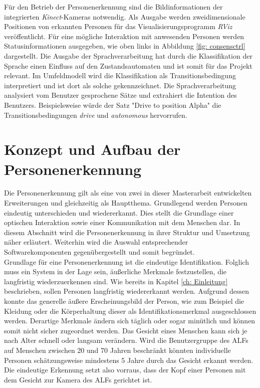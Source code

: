 	Für den Betrieb der Personenerkennung sind die Bildinformationen der integrierten \textit{Kinect}-Kameras notwendig. Als Ausgabe werden zweidimensionale Positionen von erkannten Personen für das Visualisierungsprogramm \textit{RViz} veröffentlicht. Für eine mögliche Interaktion mit anwesenden Personen werden Statusinformationen  ausgegeben, wie oben links in Abbildung \ref{fig: consensctrl} dargestellt. Die Ausgabe der Sprachverarbeitung hat durch die Klassifikation der Sprache einen Einfluss auf den Zustandsautomaten und ist somit für das Projekt relevant. Im Umfeldmodell wird die Klassifikation als Transitionsbedingung interpretiert und ist dort als solche gekennzeichnet. Die Sprachverarbeitung analysiert vom Benutzer gesprochene Sätze und extrahiert die Intention des Benutzers. Beispielsweise würde der Satz "Drive to position Alpha" die Transitionsbedingungen \textit{drive} und \textit{autonomous} hervorrufen. \\
		
	
	
	
	
	\section{Konzept und Aufbau der Personenerkennung}
	\label{sec: Konzept Personenerkennung}
	
	Die Personenerkennung gilt als eine von zwei in dieser Masterarbeit entwickelten Erweiterungen und gleichzeitig als Hauptthema. Grundlegend werden Personen eindeutig unterschieden und wiedererkannt. Dies stellt die Grundlage einer optischen Interaktion sowie einer Kommunikation mit dem Menschen dar. In diesem Abschnitt wird die Personenerkennung in ihrer Struktur und Umsetzung näher erläutert. Weiterhin wird die Auswahl entsprechender Softwarekomponenten gegenübergestellt und somit begründet.\\
	
	Grundlage für eine Personenerkennung ist die eindeutige Identifikation. Folglich muss ein System in der Lage sein, äußerliche Merkmale festzustellen, die langfristig wiederzuerkennen sind. Wie bereits in Kapitel \ref{ch: Einleitung} beschrieben, sollen Personen langfristig wiedererkannt werden. Aufgrund dessen konnte das generelle äußere Erscheinungsbild der Person, wie zum Beispiel die Kleidung oder die Körperhaltung dieser als Identifikationsmerkmal ausgeschlossen werden. Derartige Merkmale ändern sich täglich oder sogar minütlich und können somit nicht sicher zugeordnet werden. Das Gesicht eines Menschen kann sich je nach Alter schnell oder langsam verändern. Wird die Benutzergruppe des ALFs auf Menschen zwischen 20 und 70 Jahren beschränkt könnten individuelle Personen schätzungsweise mindestens 5 Jahre durch das Gesicht erkannt werden. Die eindeutige Erkennung setzt also vorraus, dass der Kopf einer Personen mit dem Gesicht zur Kamera des ALFs gerichtet ist. \\ 
	
